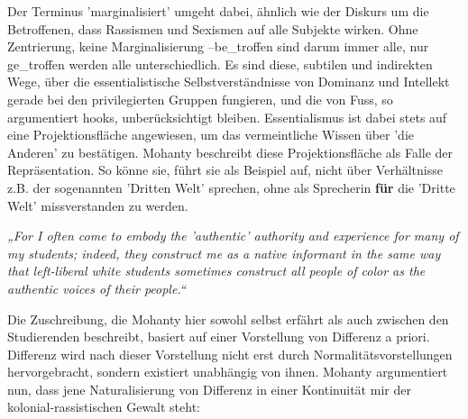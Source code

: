 Der Terminus 'marginalisiert' umgeht dabei, ähnlich wie der Diskurs um die
Betroffenen, dass Rassismen und Sexismen auf alle Subjekte wirken. Ohne
Zentrierung, keine Marginalisierung –be\_troffen sind darum immer alle, nur
ge\_troffen werden alle unterschiedlich.  Es sind diese, subtilen und indirekten
Wege, über die essentialistische Selbstverständnisse von Dominanz und Intellekt
gerade bei den privilegierten Gruppen fungieren, und die von Fuss, so
argumentiert hooks, unberücksichtigt bleiben.  Essentialismus ist dabei stets
auf eine Projektionsfläche angewiesen, um das vermeintliche Wissen über 'die
Anderen' zu bestätigen. Mohanty beschreibt diese Projektionsfläche als Falle
der Repräsentation\footnotemark{}. So könne sie, führt sie als Beispiel auf, nicht über
Verhältnisse z.B. der sogenannten 'Dritten Welt'\footnotemark{} sprechen, ohne als Sprecherin \textbf{für} die 'Dritte Welt' missverstanden
zu werden.

\begin{myenv}
  \textit{
  „For I often come to embody the 'authentic' authority and experience for many
  of my students; indeed, they construct me as a native informant in the same
  way that left-liberal white students sometimes construct all people of color
  as the authentic voices of their people.“\footnotemark {}
    }
\end{myenv}

Die Zuschreibung, die Mohanty hier sowohl selbst erfährt als auch zwischen den
Studierenden beschreibt, basiert auf einer Vorstellung von Differenz a priori.
Differenz wird nach dieser Vorstellung nicht erst durch
Normalitätsvorstellungen hervorgebracht, sondern existiert unabhängig von
ihnen. Mohanty argumentiert nun, dass jene Naturalisierung von Differenz in
einer Kontinuität mir der kolonial-rassistischen Gewalt steht:

